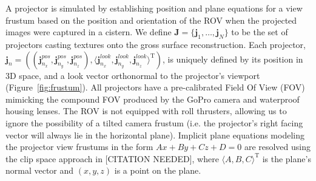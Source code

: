 \documentclass[a4paper,twoside]{article}
\begin{document}
A projector is simulated by establishing position and plane equations for a view frustum based on the position and orientation of the ROV when the projected images were captured in a cistern.  We define $\mathbf{J} = \{\mathbf{j}_{1},\dots,\mathbf{j}_{N}\}$ to be the set of projectors casting textures onto the gross surface reconstruction. Each projector, $\mathbf{j}_{n} = ((\mathbf{j}_{n_{x}}^{pos},\mathbf{j}_{n_{y}}^{pos},\mathbf{j}_{n_{z}}^{pos}), \langle \mathbf{j}_{n_{x}}^{look},\mathbf{j}_{n_{y}}^{look},\mathbf{j}_{n_{z}}^{look}\rangle ^{\mathrm{T}})$, is uniquely defined by its position in 3D space, and a look vector orthonormal to the projector's viewport (Figure~\ref{fig:frustum}). All projectors have a pre-calibrated Field Of View (FOV) mimicking the compound FOV produced by the GoPro camera and waterproof housing lenses. The ROV is not equipped with roll thrusters, allowing us to ignore the possibility of a tilted camera frustum (i.e. the projector's right facing vector will always lie in the horizontal plane). Implicit plane equations modeling the projector view frustums in the form $Ax + By + Cz + D = 0$ are resolved using the clip space approach in [CITATION NEEDED], where $\langle A, B, C\rangle ^ {\mathrm{T}}$ is the plane's normal vector and  $(x, y, z)$ is a point on the plane.
\end{document}
